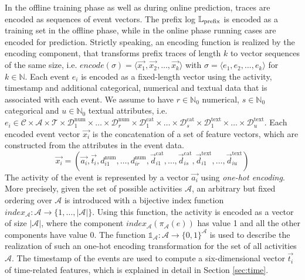 In the offline training phase as well as during online prediction, traces are encoded as sequences of event vectors.
The prefix log $\mathbb{L}_\mathrm{prefix}$ is encoded as a training set in the offline phase, while in the online phase running cases are encoded for prediction.
Strictly speaking, an encoding function is realized by the encoding component, that transforms prefix traces of length $k$ to vector sequences of the same size, i.e. $encode(\sigma) = \langle \vec{x_1}, \vec{x_2}, \dots, \vec{x_k}\rangle$ with $\sigma = \langle e_1, e_2, \dots, e_k\rangle$ for $k \in \mathbb{N}$.
Each event $e_i$ is encoded as a fixed-length vector using the activity, timestamp and additional categorical, numerical and textual data that is associated with each event.
We assume to have $r \in \mathbb{N}_0$ numerical, $s \in \mathbb{N}_0$ categorical and $u \in \mathbb{N}_0$ textual attributes, i.e. $e_i \in \mathcal{C} \times \mathcal{A}  \times \mathcal{T} \times \mathcal{D}_1^\mathrm{num} \times \dots \times \mathcal{D}_r^\mathrm{num}   \times \mathcal{D}_1^\mathrm{cat}  \times  \dots  \times \mathcal{D}_s^\mathrm{cat}   \times \mathcal{D}_1^\mathrm{text}   \times \dots  \times \mathcal{D}_u^\mathrm{text}$.
Each encoded event vector $\vec{x_i}$ is the concatenation of a set of feature vectors, which are constructed from the attributes in the event data.
\begin{equation*}
\vec{x_i}=(
\vec{a_i},
\vec{t_i},
d_{i1}^\mathrm{num}, \dots, d_{ir}^\mathrm{num},
\vec{d}_{i1}^\mathrm{cat}, \dots,\vec{d}_{is}^\mathrm{cat},
\vec{d}_{i1}^\mathrm{text}, \dots, \vec{d}_{iu}^\mathrm{text})
\end{equation*}
The activity of the event is represented by a vector $\vec{a_i}$ using \textit{one-hot encoding}.
More precisely, given the set of possible activities $\mathcal{A}$, an arbitrary but fixed ordering over $\mathcal{A}$ is introduced with a bijective index function $index_\mathcal{A} \colon \mathcal{A} \to \{1, \dots, |\mathcal{A}|\}$.
Using this function, the activity is encoded as a vector of size $|\mathcal{A}|$, where the component $index_\mathcal{A}(\pi_\mathcal{A}(e))$ has value 1 and all the other components have value 0.
The function $\mathds{1}_\mathcal{A}\colon \mathcal{A} \to \{0,1\}^\mathcal{A}$ is used to describe the realization of such an one-hot encoding transformation for the set of all activities $\mathcal{A}$.
The timestamp of the events are used to compute a six-dimensional vector $\vec{t_i}$ of time-related features, which is explained in detail in Section \ref*{sec:time}.

